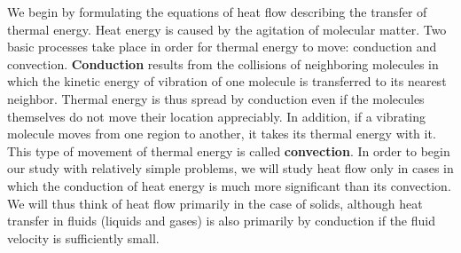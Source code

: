 We begin by formulating the equations of heat flow describing the transfer of thermal energy. Heat energy is caused by the agitation of molecular matter. Two basic processes take place in order for thermal energy to move: conduction and convection. \textbf{Conduction} results from the collisions of neighboring molecules in which the kinetic energy of vibration of one molecule is transferred to its nearest neighbor. Thermal energy is thus spread by conduction even if the molecules themselves do not move their location appreciably. In addition, if a vibrating molecule moves from one region to another, it takes its thermal energy with it. This type of movement of thermal energy is called \textbf{convection}. In order to begin our study with relatively simple problems, we will study heat flow only in cases in which the conduction of heat energy is much more significant than its convection. We will thus think of heat flow primarily in the case of solids, although heat transfer in fluids (liquids and gases) is also primarily by conduction if the fluid velocity is sufficiently small.
